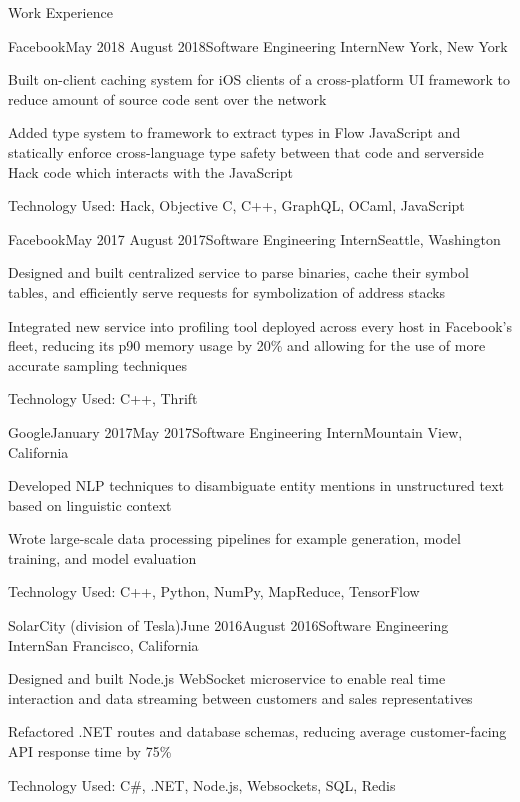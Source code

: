 \documentclass{resume} %
\begin{document}
\begin{rSection}{Work Experience}
\begin{rSubsection}{Facebook}{May 2018 \textminus August 2018}{Software Engineering Intern}{New York, New York}
\item[] Built on-client caching system for iOS clients of a cross-platform UI framework to reduce amount of source code sent over the network
\item[] Added type system to framework to extract types in Flow JavaScript and statically enforce cross-language type safety between that code and serverside Hack code which interacts with the JavaScript
\item[] Technology Used: Hack, Objective C, C++, GraphQL, OCaml, JavaScript
\end{rSubsection}
\begin{rSubsection}{Facebook}{May 2017 \textminus August 2017}{Software Engineering Intern}{Seattle, Washington}
\item[] Designed and built centralized service to parse binaries, cache their symbol tables, and efficiently serve requests for symbolization of address stacks
\item[] Integrated new service into profiling tool deployed across every host in Facebook's fleet, reducing its p90 memory usage by 20\% and allowing for the use of more accurate sampling techniques
\item[] Technology Used: C++, Thrift
\end{rSubsection}
\begin{rSubsection}{Google}{January 2017\textminus May 2017}{Software Engineering Intern}{Mountain View, California}
\item[] Developed NLP techniques to disambiguate entity mentions in unstructured text based on linguistic context
\item[] Wrote large-scale data processing pipelines for example generation, model training, and model evaluation
\item[] Technology Used: C++, Python, NumPy, MapReduce, TensorFlow
\end{rSubsection}
\begin{rSubsection}{SolarCity (division of Tesla)}{June 2016\textminus August 2016}{Software Engineering Intern}{San Francisco, California}
\item[] Designed and built Node.js WebSocket microservice to enable real time interaction and data streaming between customers and sales representatives
\item[] Refactored .NET routes and database schemas, reducing average customer-facing API response time by 75\%
\item[] Technology Used: C\#, .NET, Node.js, Websockets, SQL, Redis
\end{rSubsection}
\end{rSection}
\end{document}
